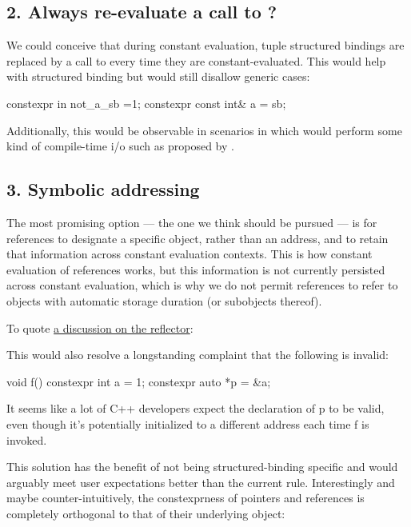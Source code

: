 \documentclass{wg21}
\begin{document}
\subsection{2. Always re-evaluate a call to ?}

We could conceive that during constant evaluation, tuple structured bindings are replaced by a call to  every time they are constant-evaluated.
This would help with  structured binding but would still disallow generic cases:

\begin{colorblock}
constexpr in not_a_sb =1;
constexpr const int&  a = sb;
\end{colorblock}

Additionally, this would be observable in scenarios in which  would perform some kind of compile-time i/o such as proposed by .

\subsection{3. Symbolic addressing}

The most promising option --- the one we think should be pursued --- is for  references to designate a specific object, rather than an address,
and to retain that information across constant evaluation contexts.
This is how constant evaluation of references works, but this information is not currently persisted across constant evaluation, which is why we do not permit
 references to refer to objects with automatic storage duration (or subobjects thereof).

To quote \href{https://lists.isocpp.org/core/2023/04/14163.php}{a discussion on the reflector}:

\begin{quoteblock}
This would also resolve a longstanding complaint that the following is invalid:
\begin{colorblock}
void f() {
    constexpr int a = 1;
    constexpr auto *p = &a;
}
\end{colorblock}

It seems like a lot of C++ developers expect the declaration of p to be valid, even though it's potentially initialized to a different address each time f is invoked.
\end{quoteblock}

This solution has the benefit of not being structured-binding specific and would arguably meet user expectations better than the current rule.
Interestingly and maybe counter-intuitively, the constexprness of pointers and references is completely orthogonal to that of their underlying object:
\end{document}
